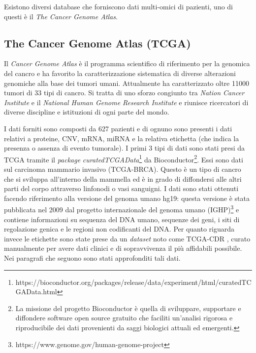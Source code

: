 \documentclass[12pt,italian]{report}
\begin{document}
	Esistono diversi database che forniscono dati multi-omici di pazienti, uno di questi è il \textit{The Cancer Genome Atlas}.
	
	\subsection{The Cancer Genome Atlas (TCGA)}
	Il \textit{Cancer Genome Atlas} \cite{TCGASource} è il programma scientifico  di riferimento per la genomica del cancro e ha favorito la caratterizzazione sistematica di diverse alterazioni genomiche alla base dei tumori umani. Attualmente ha caratterizzato oltre 11000 tumori di 33 tipi di cancro. Si tratta di uno sforzo congiunto tra \textit{Nation Cancer Institute} e il \textit{National Human Genome Research Institute} e riunisce ricercatori di diverse discipline e istituzioni di ogni parte del mondo.


	I dati forniti sono composti da 627 pazienti e di ognuno sono presenti i dati relativi a proteine, CNV, mRNA, miRNA e la relativa etichetta (che indica la presenza o assenza di evento tumorale). I primi 3 tipi di dati sono stati presi da TCGA tramite il \textit{package} \textit{curatedTCGAData}\footnote{https://bioconductor.org/packages/release/data/experiment/html/curatedTCGAData.html} da Bioconductor\footnote{La missione del progetto Bioconductor è quella di sviluppare, supportare e diffondere software open source gratuito che faciliti un'analisi rigorosa e riproducibile dei dati provenienti da saggi biologici attuali ed emergenti.}. Essi sono dati sul carcinoma mammario invasivo (TCGA-BRCA). Questo è un tipo di cancro che si sviluppa all'interno della mammella ed è in grado di diffondersi alle altri parti del corpo attraverso linfonodi o vasi sanguigni. I dati sono stati ottenuti facendo riferimento alla versione del genoma umano hg19: questa versione è stata pubblicata nel 2009 dal progetto internazionale del genoma umano (IGHP)\footnote{https://www.genome.gov/human-genome-project} e contiene informazioni su sequenza del DNA umano, sequenze dei geni, i siti di regolazione genica e le regioni non codificanti del DNA. 
	Per quanto riguarda invece le etichette sono state prese da un \textit{dataset} noto come TCGA-CDR \cite{LIU2018400}, curato manualmente per avere dati clinici e di sopravvivenza il più affidabili possibile.
	Nei paragrafi che seguono sono stati approfonditi tali dati.
	
\end{document}
